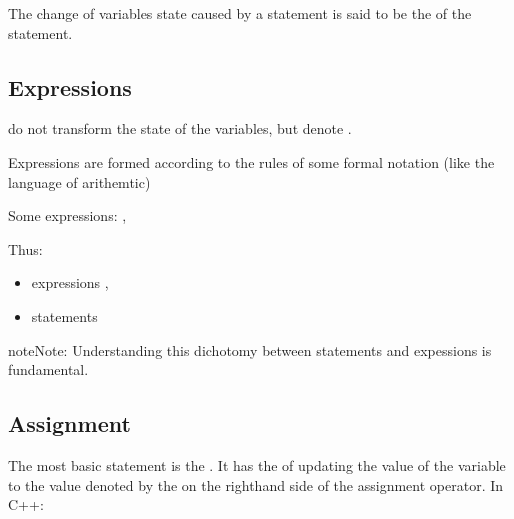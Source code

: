 \documentclass[a4paper,10pt,english]{jupyterBook}
\begin{document}
\sphinxAtStartPar
The change of variables state caused by a statement is said to be the  of the statement.


\subsection{Expressions}
\label{\detokenize{text/progtut/statements:expressions}}
\sphinxAtStartPar
{}  do not transform the state of the variables, but denote .

\sphinxAtStartPar
Expressions are formed according to the rules of some formal notation (like the language of arithemtic)

\sphinxAtStartPar
Some expressions: , 

\sphinxAtStartPar
Thus:
\begin{itemize}
\item {} 
\sphinxAtStartPar
expressions ,

\item {} 
\sphinxAtStartPar
statements 

\end{itemize}

\begin{sphinxadmonition}{note}{Note:}
\sphinxAtStartPar
Understanding this dichotomy between statements and expessions is fundamental.
\end{sphinxadmonition}


\subsection{Assignment}
\label{\detokenize{text/progtut/statements:assignment}}
\sphinxAtStartPar
The most basic statement is the . It has the  of updating the value of the variable to the value denoted by the  on the right\sphinxhyphen{}hand side of the assignment operator. In C++:
\end{document}
